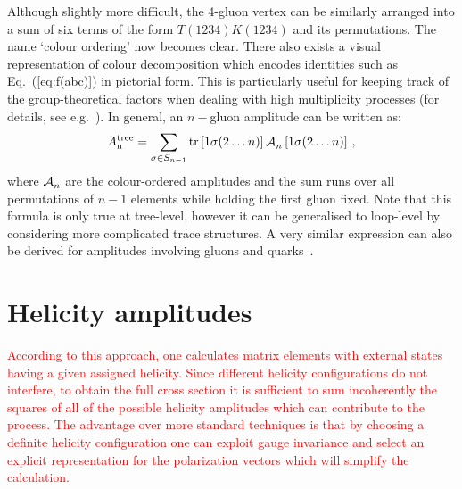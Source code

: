 \documentclass[main.tex]{subfiles}
\begin{document}
Although slightly more difficult, the 4-gluon vertex can be similarly arranged into a sum of six terms of the form $T(1234)K(1234)$ and its permutations. The name `colour ordering' now becomes clear. There also exists a visual representation of colour decomposition which encodes identities such as Eq.~(\ref{eq:f(abc)}) in pictorial form. This is particularly useful for keeping track of the group-theoretical factors when dealing with high multiplicity processes (for details, see e.g.~\cite{Dixon:1996wi}). In general, an $n-$gluon amplitude can be written as:
\begin{equation} \label{eq:colour-decomposition}
    A^\text{tree}_\text{n} = \sum_{\sigma \in S_{n-1}} \operatorname{\rm tr}\left[1\sigma(2\ldots n)\right] \mathcal{A}^\textbf{}_{n}\left[1\sigma(2\ldots n)\right] \, ,
\end{equation}
where $\mathcal{A}^\textbf{}_{n}$ are the colour-ordered amplitudes and the sum runs over all permutations of $n-1$ elements while holding the first gluon fixed. Note that this formula is only true at tree-level, however it can be generalised to loop-level by considering more complicated trace structures. A very similar expression can also be derived for amplitudes involving gluons and quarks~\cite{Dixon:1996wi}.

\section{Helicity amplitudes}
\textcolor{red}{According to this approach, one calculates matrix elements with external states having a given assigned helicity. Since different helicity configurations do not interfere, to obtain the full cross
section it is sufficient to sum incoherently the squares of all of the possible helicity amplitudes
which can contribute to the process. The advantage over more standard techniques is that by
choosing a definite helicity configuration one can exploit gauge invariance and select an explicit
representation for the polarization vectors which will simplify the calculation.}
\end{document}

